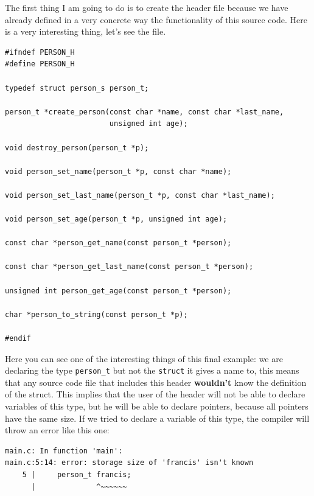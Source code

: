 \documentclass[a4paper]{article}
\begin{document}
The first thing I am going to do is to create the header file because we have
already defined in a very concrete way the functionality of this source code.
Here is a very interesting thing, let's see the file.

\noindent
\begin{minipage}[H]{\linewidth}
\mbox{}
\begin{lstlisting}[style=C,
caption={Final example of program -- \texttt{person.h}},
label={lst:finalExPerson_h}]
#ifndef PERSON_H
#define PERSON_H

typedef struct person_s person_t;

person_t *create_person(const char *name, const char *last_name,
                        unsigned int age);

void destroy_person(person_t *p);

void person_set_name(person_t *p, const char *name);

void person_set_last_name(person_t *p, const char *last_name);

void person_set_age(person_t *p, unsigned int age);

const char *person_get_name(const person_t *person);

const char *person_get_last_name(const person_t *person);

unsigned int person_get_age(const person_t *person);

char *person_to_string(const person_t *p);

#endif
\end{lstlisting}
\end{minipage}

Here you can see one of the interesting things of this final example: we are
declaring the type \verb!person_t! but not the \verb!struct! it gives a name to,
this means that any source code file that includes this header \textbf{wouldn't}
know the definition of the struct. This implies that the user of the header
will not be able to declare variables of this type, but he will be able to
declare pointers, because all pointers have the same size. If we tried to
declare a variable of this type, the compiler will throw an error like this one:

\noindent
\begin{minipage}[H]{\linewidth}
\mbox{}
\begin{lstlisting}[style=terminalStyle]
main.c: In function 'main':
main.c:5:14: error: storage size of 'francis' isn't known
    5 |     person_t francis;
      |              ^~~~~~~
\end{lstlisting}
\end{minipage}
\end{document}
